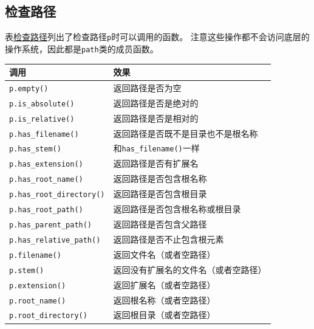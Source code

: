 \subsection{检查路径}\label{ch20.3.2}
表\hyperref[t20.4]{检查路径}列出了检查路径\texttt{p}时可以调用的函数。
注意这些操作都不会访问底层的操作系统，因此都是\texttt{path}类的成员函数。
\begin{table}[htb]
    \centering
    \begin{tabular}{l|l}
        \hline
        \textbf{调用}                       & \textbf{效果}                 \\
        \hline
        \texttt{p.empty()}                & 返回路径是否为空                    \\
        \texttt{p.is\_absolute()}         & 返回路径是否是绝对的                  \\
        \texttt{p.is\_relative()}         & 返回路径是否是相对的                  \\
        \texttt{p.has\_filename()}        & 返回路径是否既不是目录也不是根名称           \\
        \texttt{p.has\_stem()}            & 和\texttt{has\_filename()}一样 \\
        \texttt{p.has\_extension()}       & 返回路径是否有扩展名                  \\
        \texttt{p.has\_root\_name()}      & 返回路径是否包含根名称                 \\
        \texttt{p.has\_root\_directory()} & 返回路径是否包含根目录                 \\
        \texttt{p.has\_root\_path()}      & 返回路径是否包含根名称或根目录             \\
        \texttt{p.has\_parent\_path()}    & 返回路径是否包含父路径                 \\
        \texttt{p.has\_relative\_path()}  & 返回路径是否不止包含根元素               \\
        \texttt{p.filename()}             & 返回文件名（或者空路径）                \\
        \texttt{p.stem()}                 & 返回没有扩展名的文件名（或者空路径）          \\
        \texttt{p.extension()}            & 返回扩展名（或者空路径）                \\
        \texttt{p.root\_name()}           & 返回根名称（或者空路径）                \\
        \texttt{p.root\_directory()}      & 返回根目录（或者空路径）                \\

\end{tabular}
\end{table}
